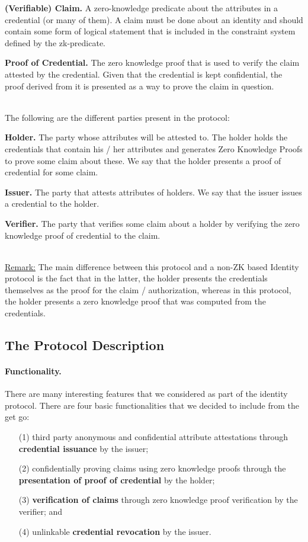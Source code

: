 \textbf{(Verifiable) Claim.} A zero-knowledge predicate about the attributes in a credential (or many of them). A claim must be done about an identity and should contain some form of logical statement that is included in the constraint system defined by the zk-predicate. 

\textbf{Proof of Credential.} The zero knowledge proof that is used to verify the claim attested by the credential. Given that the credential is kept confidential, the proof derived from it is presented as a way to prove the claim in question.

\mbox{}\\
\noindent The following are the different parties present in the protocol:

\textbf{Holder.} The party whose attributes will be attested to. The holder holds the credentials that contain his / her attributes and generates Zero Knowledge Proofs to prove some claim about these. We say that the holder presents a proof of credential for some claim.

\textbf{Issuer.} The party that attests attributes of holders. We say that the issuer issues a credential to the holder.

\textbf{Verifier.} The party that verifies some claim about a holder by verifying the zero knowledge proof of credential to the claim.

\mbox{}\\
\noindent\underline{Remark:} The main difference between this protocol and a non-ZK based Identity protocol is the fact that in the latter, the holder presents the credentials themselves as the proof for the claim / authorization, whereas in this protocol, the holder presents a zero knowledge proof that was computed from the credentials.


\subsection{The Protocol Description}


\paragraph{Functionality.}
There are many interesting features that we considered as part of the identity protocol. 
There are four basic functionalities that we decided to include from the get go: 
\begin{itemize}
\item[(1)] third party anonymous and confidential attribute attestations through \textbf{credential issuance} by the issuer;
\item[(2)] confidentially proving claims using zero knowledge proofs through the \textbf{presentation of proof of credential} by the holder;
\item[(3)] \textbf{verification of claims} through zero knowledge proof verification by the verifier; and
\item[(4)] unlinkable \textbf{credential revocation} by the issuer. 
\end{itemize}

